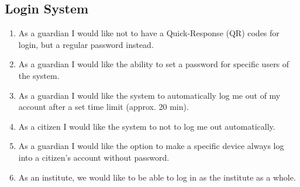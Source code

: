 \subsection*{Login System}
\begin{enumerate}
  \setlength\itemsep{0em}
  \item As a guardian I would like not to have a Quick-Response (QR) codes for login, but a regular password instead.
  \item As a guardian I would like the ability to set a password for specific users of the system.
  \item As a guardian I would like the system to automatically log me out of my account after a set time limit (approx. 20 min).
  \item As a citizen I would like the system to not to log me out automatically.
  \item As a guardian I would like the option to make a specific device always log into a citizen's account without password.
  \item As an institute, we would like to be able to log in as the institute as a whole.
\end{enumerate}


